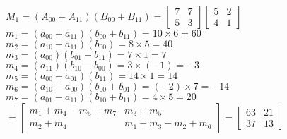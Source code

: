 \documentclass[letterpaper,10pt]{article}
\begin{document}
\begin{flushleft}
\newpage
~\\ 
$M_1=(A_{00}+A_{11})(B_{00}+B_{11})=
\left[ 
	\begin{array}{cc}
		7 & 7\\
		5 & 3 
	\end{array} 
\right]
\left[ 
	\begin{array}{cc}
		5 & 2\\
		4 & 1 
	\end{array} 
\right]$\\
	$m_1=(a_{00}+a_{11})(b_{00}+b_{11})=10 \times 6=60$\\
	$m_2=(a_{10}+a_{11})(b_{00})=8 \times 5=40$\\
	$m_3=(a_{00})(b_{01}-b_{11})=7 \times 1=7$\\
	$m_4=(a_{11})(b_{10}-b_{00})=3 \times (-1)=-3$\\
	$m_5=(a_{00}+a_{01})(b_{11})=14 \times 1=14$\\
	$m_6=(a_{10}-a_{00})(b_{00}+b_{01})=(-2) \times 7=-14$\\
	$m_7=(a_{01}-a_{11})(b_{10}+b_{11})=4 \times 5=20$\\
$=
\left[ 
	\begin{array}{cc}
		m_1+m_4-m_5+m_7 & m_3+m_5\\
		m_2+m_4 & m_1+m_3-m_2+m_6 
	\end{array} 
\right]=
\left[ 
	\begin{array}{cc}
		63 & 21\\
		37 & 13 
	\end{array} 
\right]$\\
~\\




\end{flushleft}
\end{document}
